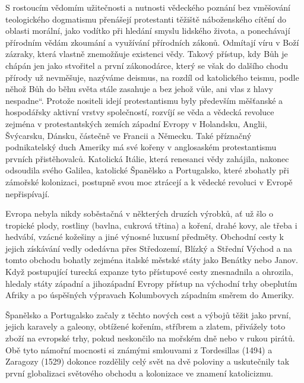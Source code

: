     S rostoucím vědomím užitečnosti a nutnosti vědeckého poznání bez vměšování teologického
    dogmatismu přenášejí protestanti těžiště náboženského cítění do oblasti morální, jako vodítko
    při hledání smyslu lidského života, a ponechávají přírodním vědám zkoumání a využívání
    přírodních zákonů. Odmítají víru v Boží zázraky, která vlastně znemožňuje existenci vědy. Takový
    přístup, kdy Bůh je chápán jen jako stvořitel a první zákonodárce, který se však do dalšího
    chodu přírody už nevměšuje, nazýváme deismus, na rozdíl od katolického teismu, podle něhož Bůh
    do běhu světa stále zasahuje a bez jehož vůle, ani vlas z hlavy nespadne“. Protože nositeli
    idejí protestantismu byly především měšťanské a hospodářsky aktivní vrstvy společností, rozvíjí
    se věda a vědecká revoluce zejména v protestantských zemích západní Evropy v Holandsku, Anglii,
    Švýcarsku, Dánsku, částečně ve Francii a Německu. Také příznačný podnikatelský duch Ameriky má
    své kořeny v anglosaském protestantismu prvních přistěhovalců. Katolická Itálie, která renesanci
    vědy zahájila, nakonec odsoudila svého Galilea, katolické Španělsko a Portugalsko, které
    zbohatly při zámořské kolonizaci, postupně svou moc ztrácejí a k vědecké revoluci v Evropě
    nepřispívají.

    Evropa nebyla nikdy soběstačná v některých druzích výrobků, ať už šlo o tropické plody, rostliny
    (bavlna, cukrová třtina) a koření, drahé kovy, ale třeba i hedvábí, vzácné kožešiny a jiné
    výnosné luxusní předměty. Obchodní cesty k jejich získávání vedly odedávna přes Středozemí,
    Blízký a Střední Východ a na tomto obchodu bohatly zejména italské městské státy jako Benátky
    nebo Janov. Když postupující turecká expanze tyto přístupové cesty znesnadnila a ohrozila,
    hledaly státy západní a jihozápadní Evropy přístup na východní trhy obeplutím Afriky a po
    úspěšných výpravach Kolumbovych západním směrem do Ameriky.

    Španělsko a Portugalsko začaly z těchto nových cest a výbojů těžit jako první, jejich karavely a
    galeony, obtížené kořením, stříbrem a zlatem, přivážely toto zboží na evropské trhy, pokud
    neskončilo na mořském dně nebo v rukou pirátů. Obě tyto námořní mocnosti si známými smlouvami z
    Tordesillas (1494) a Zaragozy (1529) dokonce rozdělily celý svět na dvě poloviny a uskutečnily
    tak první globalizaci světového obchodu a kolonizace ve znamení katolicizmu.

